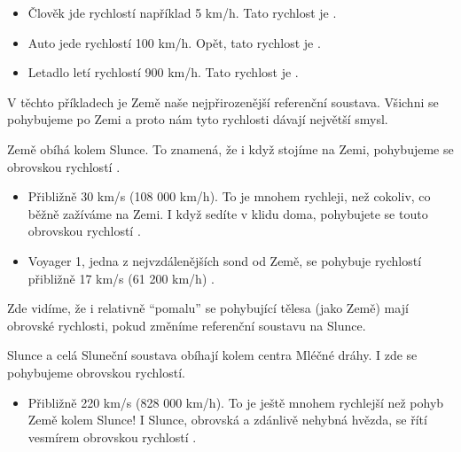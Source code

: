 \documentclass[letterpaper,10pt,english]{jupyterBook}
\begin{document}
\sphinxAtStartPar
{}
\begin{itemize}
\item {} 
\sphinxAtStartPar
{} Člověk jde rychlostí například 5 km/h. Tato rychlost je .

\item {} 
\sphinxAtStartPar
{} Auto jede rychlostí 100 km/h. Opět, tato rychlost je .

\item {} 
\sphinxAtStartPar
{} Letadlo letí rychlostí 900 km/h. Tato rychlost je .

\end{itemize}

\sphinxAtStartPar
V těchto příkladech je Země naše nejpřirozenější referenční soustava. Všichni se pohybujeme po Zemi a proto nám tyto rychlosti dávají největší smysl.

\sphinxAtStartPar
{}

\sphinxAtStartPar
Země obíhá kolem Slunce. To znamená, že i když stojíme na Zemi, pohybujeme se obrovskou rychlostí .
\begin{itemize}
\item {} 
\sphinxAtStartPar
{} Přibližně 30 km/s (108 000 km/h). To je mnohem rychleji, než cokoliv, co běžně zažíváme na Zemi. I když sedíte v klidu doma, pohybujete se touto obrovskou rychlostí .

\item {} 
\sphinxAtStartPar
{} Voyager 1, jedna z nejvzdálenějších sond od Země, se pohybuje rychlostí přibližně 17 km/s (61 200 km/h) .

\end{itemize}

\sphinxAtStartPar
Zde vidíme, že i relativně “pomalu” se pohybující tělesa (jako Země) mají obrovské rychlosti, pokud změníme referenční soustavu na Slunce.

\sphinxAtStartPar
{}

\sphinxAtStartPar
Slunce a celá Sluneční soustava obíhají kolem centra Mléčné dráhy. I zde se pohybujeme obrovskou rychlostí.
\begin{itemize}
\item {} 
\sphinxAtStartPar
{} Přibližně 220 km/s (828 000 km/h). To je ještě mnohem rychlejší než pohyb Země kolem Slunce! I Slunce, obrovská a zdánlivě nehybná hvězda, se řítí vesmírem obrovskou rychlostí .

\end{itemize}
\end{document}
